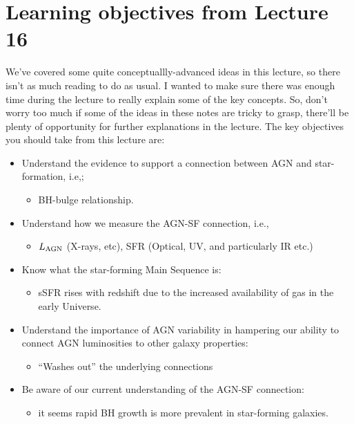 \documentclass[11pt]{article}
\begin{document}
\section{Learning objectives from Lecture 16}
We've covered some quite conceptuallly-advanced ideas in this lecture,
so there isn't as much reading to do as usual. I wanted to make sure
there was enough time during the lecture to really explain some of the
key concepts. So, don't worry too much if some of the ideas in these
notes are tricky to grasp, there'll be plenty of opportunity for
further explanations in the lecture. The key objectives you should
take from this lecture are:

\begin{itemize}
\item Understand the evidence to support a connection between AGN and
  star-formation, i.e,;
  \begin{itemize}
  \item BH-bulge relationship.
  \end{itemize}

\item Understand how we measure the AGN-SF connection, i.e., 
  \begin{itemize}
  \item $L_{\rm AGN}$ (X-rays, etc), SFR (Optical, UV, and
    particularly IR etc.) 
  \end{itemize}

\item Know what the star-forming Main Sequence is:
  \begin{itemize}
  \item sSFR rises with redshift due to the increased availability of gas in the early Universe.
  \end{itemize}
    
\item Understand the importance of AGN variability in hampering our
  ability to connect AGN luminosities to other galaxy properties:
  \begin{itemize}
  \item “Washes out” the underlying connections
  \end{itemize}

\item Be aware of our current understanding of the AGN-SF connection:
  \begin{itemize}
  \item it seems rapid BH growth is more prevalent in star-forming galaxies.
  \end{itemize}
      
\end{itemize}
\end{document}
